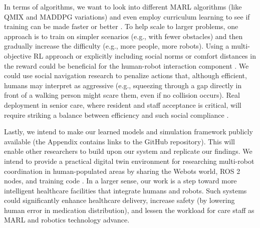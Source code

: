 \documentclass[conference]{IEEEtran}
\begin{document}
In terms of algorithms, we want to look into different MARL algorithms (like QMIX and MADDPG variations) and even employ curriculum learning to see if training can be made faster or better \citep{wang2023a, yang2022}. To help scale to larger problems, one approach is to train on simpler scenarios (e.g., with fewer obstacles) and then gradually increase the difficulty (e.g., more people, more robots). Using a multi-objective RL approach or explicitly including social norms or comfort distances in the reward could be beneficial for the human-robot interaction component \citep{yang2022, rostumi2019}. We could use social navigation research to penalize actions that, although efficient, humans may interpret as aggressive (e.g., squeezing through a gap directly in front of a walking person might scare them, even if no collision occurs). Real deployment in senior care, where resident and staff acceptance is critical, will require striking a balance between efficiency and such social compliance \citep{ivanovic2019, rostumi2019}.

Lastly, we intend to make our learned models and simulation framework publicly available (the Appendix contains links to the GitHub repository). This will enable other researchers to build upon our system and replicate our findings. We intend to provide a practical digital twin environment for researching multi-robot coordination in human-populated areas by sharing the Webots world, ROS 2 nodes, and training code \citep{ztouni2021, salinas2023}. In a larger sense, our work is a step toward more intelligent healthcare facilities that integrate humans and robots. Such systems could significantly enhance healthcare delivery, increase safety (by lowering human error in medication distribution), and lessen the workload for care staff as MARL and robotics technology advance.


\end{document}
